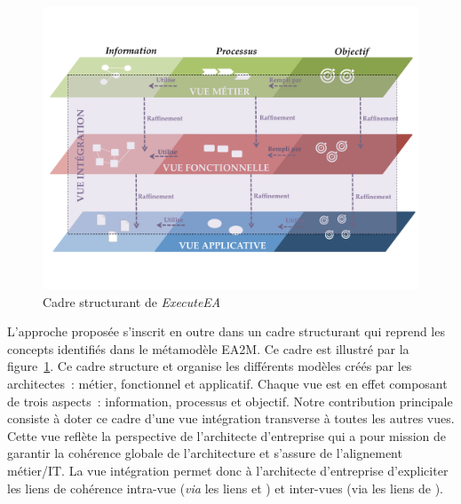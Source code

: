 \begin{figure}[!ht]
 \begin{center}
 \includegraphics[trim= 0cm 2cm 0cm 0cm, width=1\textwidth]{figures/4_demarche/vue_integration.pdf}
 \end{center}
 \caption{Cadre structurant de \protect\emph{ExecuteEA}}
 \label{fig:cadre_structurant}
\end{figure}

L'approche proposée s'inscrit en outre dans un cadre structurant qui reprend les concepts identifiés dans le métamodèle
EA2M. Ce cadre est illustré par la figure~\ref{fig:cadre_structurant}. Ce cadre structure et organise les différents modèles
créés par les architectes~: métier, fonctionnel et applicatif. Chaque vue est en effet composant de trois aspects~: information,
processus et objectif. Notre contribution principale consiste à doter ce cadre d'une vue intégration transverse à toutes les autres vues.
Cette vue reflète la perspective de l'architecte d'entreprise qui a pour mission de garantir la cohérence globale de l'architecture
et s'assure de l'alignement métier/IT. La vue intégration permet donc à l’architecte d'entreprise
d'expliciter les liens de cohérence intra-vue (\emph{via} les liens  et ) et inter-vues (via les liens de ).






